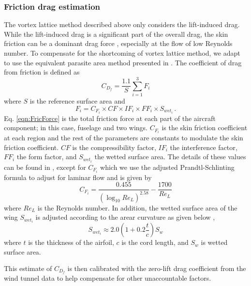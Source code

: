 \documentclass[11pt]{ucthesis}
\begin{document}
\subsubsection{Friction drag estimation}
The vortex lattice method described above only considers the lift-induced drag. While the lift-induced drag is a significant part of the overall drag, the skin friction can be a dominant drag force \cite{thomas1984aircraft}, especially at the flow of low Reynolds number. To compensate for the shortcoming of vortex lattice method, we adapt to use the equivalent parasite area method presented in \cite{hull2007fundamentals}. The coefficient of drag from friction is defined as 
\begin{equation}
C_{D_f} = \frac{1.1}{S} \sum_{i=1}^{3} F_i
\end{equation}
where $S$ is the reference surface area and 
\begin{equation}
F_i = C_{F_i}\times CF\times IF_i\times FF_i\times S_{{wet}_i} \,.
\label{eqn:FricForce}
\end{equation}
Eq. \ref{eqn:FricForce} is the total friction force at each part of the aircraft component; in this case, fuselage and two wings. $C_{F_i}$ is the skin friction coefficient at each region and the rest of the parameters are constants to modulate the skin friction coefficient. $CF$ is the compressibility factor, $IF_i$ the interference factor, $FF_i$ the form factor, and $S_{{wet}_i}$ the wetted surface area. The details of these values can be found in \cite{hull2007fundamentals}, except for $C_{F_i}$ which we use the adjusted Prandtl-Schlinting formula to adjust for laminar flow and is given by \cite{bertin1998aerodynamics}
\begin{equation} \label{cfi_1}
C_{F_i} = \frac{0.455}{(\log_{10} Re_L)^{2.58}}-\frac{1700}{Re_L}
\end{equation} 
where $Re_L$ is the Reynolds number. In addition, the wetted surface area of the wing $S_{{wet}_i}$ is adjusted according to the arear curvature as given below \cite{bertin1998aerodynamics},
\begin{equation}
S_{{wet}_i}\approx 2.0 \left (1+0.2\frac{t}{c} \right ) S_w
\label{eqn:wetWing}
\end{equation}
where $t$ is the thickness of the airfoil, $c$ is the cord length, and $S_w$ is wetted surface area.

This estimate of $C_{D_f}$ is then calibrated with the zero-lift drag coefficient from the wind tunnel data to help compensate for other unaccountable factors.
\end{document}
